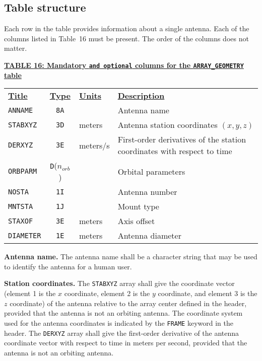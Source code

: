 \documentclass[twoside]{article}
\newcommand{\Hi}[1]{\textcolor{hicol}{#1}}
\newcommand{\Me}[1]{\textcolor{mecol}{#1}}
\newcommand{\norb}{$n_{orb}$}
\begin{document}
\subsection{Table structure}

Each row in the table provides information about a single antenna.
Each of the columns listed in Table~\Hi{16} must be present.  The
order of the columns does not matter.

\begin{center}
\underline{\bf{TABLE \Hi{16}: Mandatory {\tt and optional} columns for
    the {\tt \Me{ARRAY\_GEOMETRY}} table}}\\
\begin{tabular}{lcll}
\noalign{\vspace{2pt}}
\underline{{\bf Title\vphantom{y}}} & \underline{\bf{Type}} &
   \underline{{\bf Units\vphantom{y}}} & \underline{\bf{Description}} \\
\noalign{\vspace{2pt}}
{\tt ANNAME}  & {\tt 8A} &          & Antenna name \\
{\tt STABXYZ} & {\tt 3D} & meters   & \Hi{Antenna s}tation coordinates
                                      \Hi{$(x,y,z)$} \\
{\tt DERXYZ}  & {\tt 3E} & meters/s & First-order derivatives of the
                                      station coordinates with respect
                                      to time \\
{\tt ORBPARM} & {\tt D}(\norb) &    & Orbital parameters \\
{\tt NOSTA}   & {\tt 1I} &          & \Hi{Antenna} number \\
{\tt MNTSTA}  & {\tt 1J} &          & Mount type \\
{\tt STAXOF}  & {\tt 3E} & meters   & Axis offset \\
\hline
\Me{{\tt DIAMETER}} & \Me{{\tt 1E}} & \Me{meters} & \Me{Antenna diameter}
\end{tabular}
\end{center}

{\bf Antenna name.} The antenna name shall be a character string that
may be used to identify the antenna for a human user.

{\bf Station coordinates.} The {\tt STABXYZ} array shall give the
coordinate vector (element 1 is the $x$ coordinate, element 2 is the
$y$ coordinate, and element 3 is the $z$ coordinate) of the antenna
relative to the array center defined in the header, provided that the
antenna is not an orbiting antenna.  The coordinate system used for
the antenna coordinates is indicated by the {\tt FRAME} keyword in the
header.  The {\tt DERXYZ} array shall give the first-order derivative
of the antenna coordinate vector with respect to time in meters per
second, provided that the antenna is not an orbiting antenna.
\end{document}
